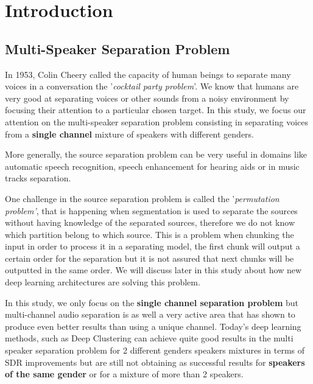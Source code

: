 \documentclass[master, tikz, final,11pt, dvipdfmx]{iscs-thesis}
\begin{document}
\tableofcontents

\newpage

\listoffigures %

\newpage

\listoftables %

\newpage



\chapter{Introduction}


\section{Multi-Speaker Separation Problem}
In 1953, Colin Cheery \cite{Colin} called the capacity of human beings to separate many voices in a conversation the '\textit{cocktail party problem}'. We know that humans are very good at separating voices or other sounds from a noisy environment by focusing their attention to a particular chosen target. In this study, we focus our attention on the multi-speaker separation problem consisting in separating voices from a \textbf{single channel} mixture of speakers with different genders. 

More generally, the source separation problem can be very useful in domains like automatic speech recognition, speech enhancement for hearing aids or in music tracks separation.

One challenge in the source separation problem is called the '\textit{permutation problem'}, that is happening when segmentation is used to separate the sources without having knowledge of the separated sources, therefore we do not know which partition belong to which source. This is a problem when chunking the input in order to process it in a separating model, the first chunk will output a certain order for the separation but it is not assured that next chunks will be outputted in the same order. We will discuss later in this study about how new deep learning architectures are solving this problem.

In this study, we only focus on the \textbf{single channel separation problem} but multi-channel audio separation is as well a very active area that has shown to produce even better results than using a unique channel. Today's deep learning methods, such as Deep Clustering \cite{DPCLV1, DPCLV2} can achieve quite good results in the multi speaker separation problem for 2 different genders speakers mixtures in terms of SDR improvements but are still not obtaining as successful results for \textbf{speakers of the same gender} or for a mixture of more than 2 speakers. 
\end{document}
